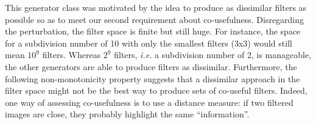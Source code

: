 \documentclass[a4paper]{report}
\begin{document}
			\par
			This generator class was motivated by the idea to produce as dissimilar filters as possible so as to meet our second requirement about co-usefulness. Disregarding the perturbation, the filter space is finite but still huge. For instance, the space for a subdivision number of 10 with only the smallest filters (3x3) would still mean $10^9$ filters.  Whereas $2^9$ filters, \textit{i.e.} a subdivision number of 2, is manageable, the other generators are able to produce filters as dissimilar. Furthermore, the following non-monotonicity property suggests that a dissimilar approach in the filter space might not be the best way to produce sets of co-useful filters. Indeed, one way of assessing co-usefulness is to use a distance measure: if two filtered images are close, they probably highlight the same ``information''.
			
\end{document}
